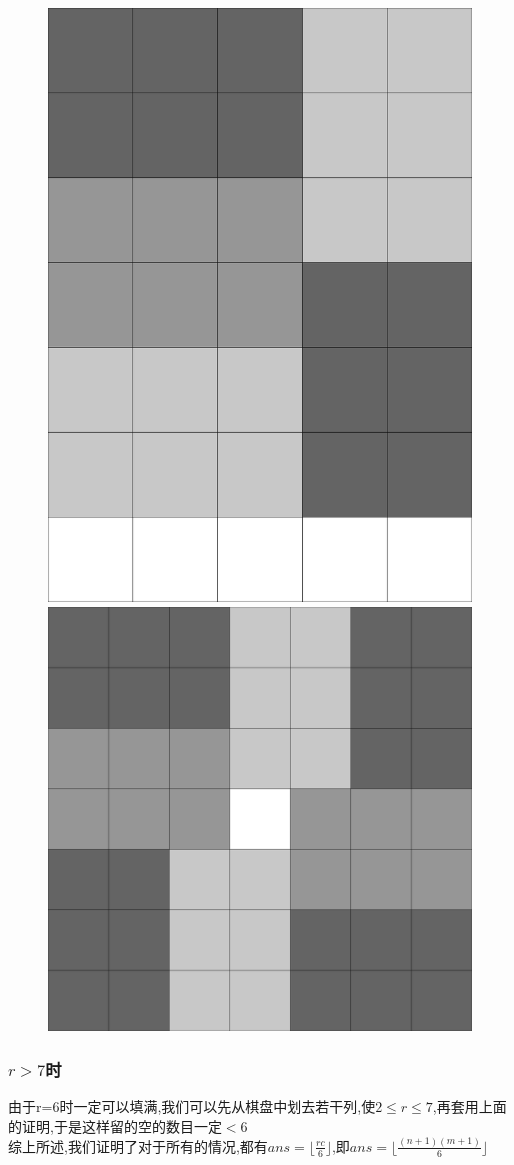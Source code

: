 \documentclass{beamer}
\begin{document}
\begin{frame}
\begin{figure}[htbp]
\begin{minipage}[t]{0.32\textwidth}
					\end{minipage}
				\end{figure}
				\begin{figure}[htbp]
					\centering
					\begin{minipage}[t]{0.48\textwidth}
						\centering
						\includegraphics[height=0.65\textwidth]{pictures/5-4.png}
					\end{minipage}
					\begin{minipage}[t]{0.48\textwidth}
						\centering
						\includegraphics[height=0.65\textwidth]{pictures/5-5.png}
					\end{minipage}
				\end{figure}

			\end{frame}
			\begin{frame}\frametitle{$r>7$时}
				由于r=6时一定可以填满,我们可以先从棋盘中划去若干列,使$2\le r\le7$,再套用上面的证明,于是这样留的空的数目一定$<6$\\
				综上所述,我们证明了对于所有的情况,都有$ans=\lfloor\frac{rc}{6}\rfloor$,即$ans=\lfloor\frac{(n+1)(m+1)}6\rfloor$
			\end{frame}
\end{document}
